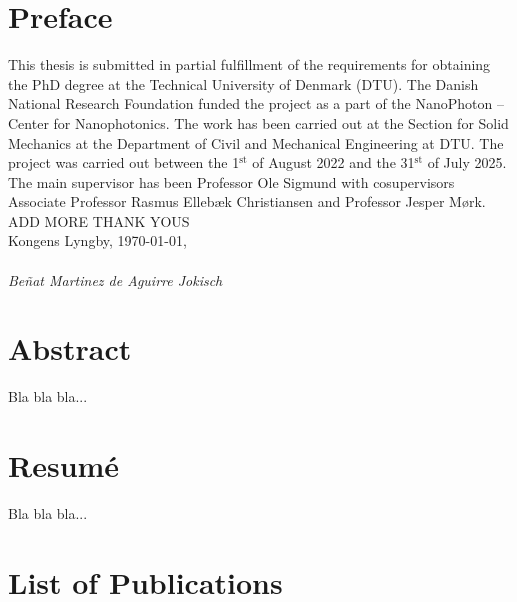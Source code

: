 \chapter*{Preface}

This thesis is submitted in partial fulfillment of the requirements for obtaining
the PhD degree at the Technical University of Denmark
(DTU). The Danish National Research Foundation funded the project as a part of
the NanoPhoton -- Center for Nanophotonics. The work has been carried out at the
Section for Solid Mechanics at the Department of Civil and Mechanical Engineering
at DTU. The project was carried out between the 1$^\text{st}$ of August 2022 and the 31$^\text{st}$
of July 2025. The main supervisor has been Professor Ole Sigmund with cosupervisors Associate Professor Rasmus Ellebæk Christiansen and Professor Jesper
Mørk.\\

ADD MORE THANK YOUS\\

\noindent Kongens Lyngby, \today,\\
\vspace{0.1cm}\\
\noindent \textit{Beñat Martinez de Aguirre Jokisch}

\chapter*{Abstract}

Bla bla bla...

\chapter*{Resumé}

Bla bla bla...

\cleardoublepage
\chapter*{List of Publications}
\nocite{ownpub0,ownpub1}
\newrefcontext[sorting=none,labelprefix=P]
\printbibliography[env=bibliographyNUM,keyword=myPub,title={List of publications},heading=none,resetnumbers]
\newrefcontext[sorting=none,labelprefix=M]
\printbibliography[env=bibliographyNUM,keyword=myMan,heading=none,resetnumbers]

\cleardoublepage

{
  \hypersetup{linkcolor=black}
  \tableofcontents*
}

